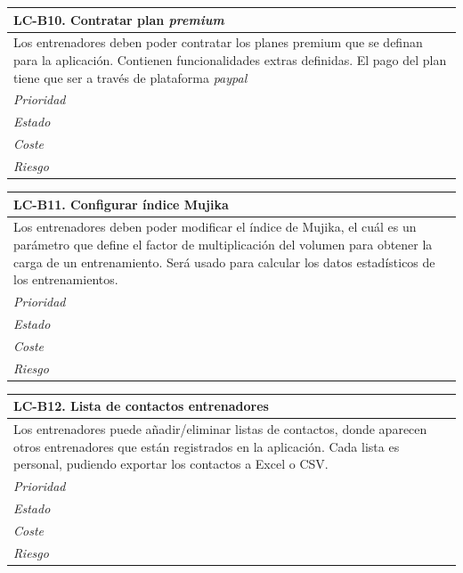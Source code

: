 	\begin{center}
		\begin{tabularx}{15cm}{|X|}
			\hline 
				\bf{LC-B10. Contratar plan \it{premium}}\\
			\hline
				Los entrenadores deben poder contratar los planes premium que se definan para la aplicación. Contienen funcionalidades extras definidas. El pago del plan tiene que ser a través de plataforma \it{paypal}\\
			\hline
				\it{Prioridad}\\
			\hline
				\it{Estado}\\
			\hline
				\it{Coste}\\
			\hline
				\it{Riesgo}\\
			\hline
		\end{tabularx}
	\end{center}
	
	\begin{center}
		\begin{tabularx}{15cm}{|X|}
			\hline 
				\bf{LC-B11. Configurar índice Mujika}\\
			\hline
				Los entrenadores deben poder modificar el índice de Mujika, el cuál es un parámetro que define el factor de multiplicación del volumen para obtener la carga de un entrenamiento. Será usado para calcular los datos estadísticos de los entrenamientos.\\
			\hline
				\it{Prioridad}\\
			\hline
				\it{Estado}\\
			\hline
				\it{Coste}\\
			\hline
				\it{Riesgo}\\
			\hline
		\end{tabularx}
	\end{center}
	
	\begin{center}
		\begin{tabularx}{15cm}{|X|}
			\hline 
				\bf{LC-B12. Lista de contactos entrenadores}\\
			\hline
				Los entrenadores puede añadir/eliminar listas de contactos, donde aparecen otros entrenadores que están registrados en la aplicación. Cada lista es personal, pudiendo exportar los contactos a Excel o CSV.\\
			\hline
				\it{Prioridad}\\
			\hline
				\it{Estado}\\
			\hline
				\it{Coste}\\
			\hline
				\it{Riesgo}\\
			\hline
		\end{tabularx}
	\end{center}
	
